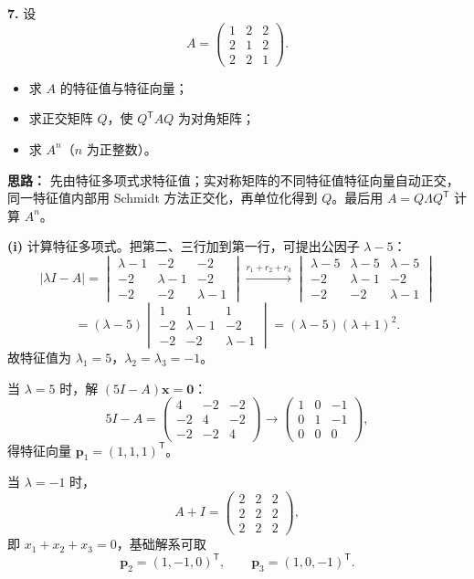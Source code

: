 \textbf{7.} 设
\[
A=\begin{pmatrix}
1&2&2\\
2&1&2\\
2&2&1
\end{pmatrix}.
\]
\begin{itemize}
  \item[(i)] 求 \(A\) 的特征值与特征向量；
  \item[(ii)] 求正交矩阵 \(Q\)，使 \(Q^{\mathsf T}AQ\) 为对角矩阵；
  \item[(iii)] 求 \(A^n\)（\(n\) 为正整数）。
\end{itemize}

\ifshowsolutions%
\textbf{思路：} 先由特征多项式求特征值；实对称矩阵的不同特征值特征向量自动正交，同一特征值内部用 Schmidt 方法正交化，再单位化得到 \(Q\)。最后用 \(A=Q\Lambda Q^{\mathsf T}\) 计算 \(A^n\)。

\textbf{(i)} 计算特征多项式。把第二、三行加到第一行，可提出公因子 \(\lambda-5\)：
\[
|\lambda I-A|=
\begin{vmatrix}
\lambda-1&-2&-2\\
-2&\lambda-1&-2\\
-2&-2&\lambda-1
\end{vmatrix}
\xrightarrow{r_1+r_2+r_3}
\begin{vmatrix}
\lambda-5&\lambda-5&\lambda-5\\
-2&\lambda-1&-2\\
-2&-2&\lambda-1
\end{vmatrix}
\]
\[
=(\lambda-5)\begin{vmatrix}
1&1&1\\
-2&\lambda-1&-2\\
-2&-2&\lambda-1
\end{vmatrix}
=(\lambda-5)(\lambda+1)^2.
\]
故特征值为 \(\lambda_1=5\)，\(\lambda_2=\lambda_3=-1\)。

当 \(\lambda=5\) 时，解 \((5I-A)\boldsymbol{x}=\boldsymbol{0}\)：
\[
5I-A=\begin{pmatrix}
4&-2&-2\\
-2&4&-2\\
-2&-2&4
\end{pmatrix}
\longrightarrow
\begin{pmatrix}
1&0&-1\\
0&1&-1\\
0&0&0
\end{pmatrix},
\]
得特征向量 \(\boldsymbol{p}_1=(1,1,1)^{\mathsf T}\)。

当 \(\lambda=-1\) 时，
\[
A+I=\begin{pmatrix}
2&2&2\\
2&2&2\\
2&2&2
\end{pmatrix},
\]
即 \(x_1+x_2+x_3=0\)，基础解系可取
\[
\boldsymbol{p}_2=(1,-1,0)^{\mathsf T},\qquad
\boldsymbol{p}_3=(1,0,-1)^{\mathsf T}.
\]

